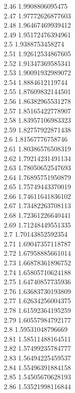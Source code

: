 {2.46	1.9908806095475\\
2.47	1.97772626877603\\
2.48	1.96467469939412\\
2.49	1.95172476394961\\
2.5	1.9388753458274\\
2.51	1.92612534867605\\
2.52	1.91347369585341\\
2.53	1.90091932989072\\
2.54	1.8884612119744\\
2.55	1.87609832144501\\
2.56	1.86382965531278\\
2.57	1.85165422778907\\
2.58	1.83957106983323\\
2.59	1.82757922871438\\
2.6	1.81567776758746\\
2.61	1.80386576508319\\
2.62	1.79214231491134\\
2.63	1.78050652547693\\
2.64	1.76895751950879\\
2.65	1.75749443370019\\
2.66	1.74611641836102\\
2.67	1.73482263708113\\
2.68	1.72361226640441\\
2.69	1.71248449551335\\
2.7	1.70143852592354\\
2.71	1.69047357118787\\
2.72	1.67958885661014\\
2.73	1.66878361896752\\
2.74	1.65805710624188\\
2.75	1.64740857735936\\
2.76	1.63683730193809\\
2.77	1.62634256004375\\
2.78	1.61592364195259\\
2.79	1.60557984792177\\
2.8	1.59531048796669\\
2.81	1.58511488164511\\
2.82	1.57499235784777\\
2.83	1.56494225459537\\
2.84	1.55496391884158\\
2.85	1.54505670628193\\
2.86	1.53521998116844\\
}
